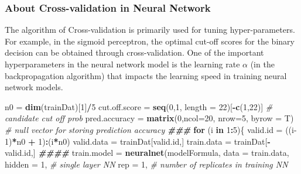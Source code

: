 \documentclass[
]{book}
\newenvironment{Shaded}{\begin{snugshade}}{\end{snugshade}}
\newcommand{\AttributeTok}[1]{\textcolor[rgb]{0.13,0.29,0.53}{#1}}
\newcommand{\CommentTok}[1]{\textcolor[rgb]{0.56,0.35,0.01}{\textit{#1}}}
\newcommand{\ControlFlowTok}[1]{\textcolor[rgb]{0.13,0.29,0.53}{\textbf{#1}}}
\newcommand{\DecValTok}[1]{\textcolor[rgb]{0.00,0.00,0.81}{#1}}
\newcommand{\DocumentationTok}[1]{\textcolor[rgb]{0.56,0.35,0.01}{\textbf{\textit{#1}}}}
\newcommand{\FunctionTok}[1]{\textcolor[rgb]{0.13,0.29,0.53}{\textbf{#1}}}
\newcommand{\NormalTok}[1]{#1}
\newcommand{\OtherTok}[1]{\textcolor[rgb]{0.56,0.35,0.01}{#1}}
\newcommand{\SpecialCharTok}[1]{\textcolor[rgb]{0.81,0.36,0.00}{\textbf{#1}}}
\begin{document}
\hypertarget{about-cross-validation-in-neural-network}{%
\subsubsection{About Cross-validation in Neural Network}\label{about-cross-validation-in-neural-network}}

The algorithm of Cross-validation is primarily used for tuning hyper-parameters. For example, in the sigmoid perceptron, the optimal cut-off scores for the binary decision can be obtained through cross-validation. One of the important hyperparameters in the neural network model is the learning rate \(\alpha\) (in the backpropagation algorithm) that impacts the learning speed in training neural network models.

\begin{Shaded}
\begin{Highlighting}[]
\NormalTok{n0 }\OtherTok{=} \FunctionTok{dim}\NormalTok{(trainDat)[}\DecValTok{1}\NormalTok{]}\SpecialCharTok{/}\DecValTok{5}
\NormalTok{cut.off.score }\OtherTok{=} \FunctionTok{seq}\NormalTok{(}\DecValTok{0}\NormalTok{,}\DecValTok{1}\NormalTok{, }\AttributeTok{length =} \DecValTok{22}\NormalTok{)[}\SpecialCharTok{{-}}\FunctionTok{c}\NormalTok{(}\DecValTok{1}\NormalTok{,}\DecValTok{22}\NormalTok{)]        }\CommentTok{\# candidate cut off prob}
\NormalTok{pred.accuracy }\OtherTok{=} \FunctionTok{matrix}\NormalTok{(}\DecValTok{0}\NormalTok{,}\AttributeTok{ncol=}\DecValTok{20}\NormalTok{, }\AttributeTok{nrow=}\DecValTok{5}\NormalTok{, }\AttributeTok{byrow =}\NormalTok{ T)  }\CommentTok{\# null vector for storing prediction accuracy}
\DocumentationTok{\#\#\#}
\ControlFlowTok{for}\NormalTok{ (i }\ControlFlowTok{in} \DecValTok{1}\SpecialCharTok{:}\DecValTok{5}\NormalTok{)\{}
\NormalTok{  valid.id }\OtherTok{=}\NormalTok{ ((i}\DecValTok{{-}1}\NormalTok{)}\SpecialCharTok{*}\NormalTok{n0 }\SpecialCharTok{+} \DecValTok{1}\NormalTok{)}\SpecialCharTok{:}\NormalTok{(i}\SpecialCharTok{*}\NormalTok{n0)}
\NormalTok{  valid.data }\OtherTok{=}\NormalTok{ trainDat[valid.id,]}
\NormalTok{  train.data }\OtherTok{=}\NormalTok{ trainDat[}\SpecialCharTok{{-}}\NormalTok{valid.id,]}
  \DocumentationTok{\#\#\#\#}
\NormalTok{  train.model }\OtherTok{=} \FunctionTok{neuralnet}\NormalTok{(modelFormula,}
                         \AttributeTok{data =}\NormalTok{ train.data,}
                         \AttributeTok{hidden =} \DecValTok{1}\NormalTok{,               }\CommentTok{\# single layer NN}
                         \AttributeTok{rep =} \DecValTok{1}\NormalTok{,                  }\CommentTok{\# number of replicates in training NN}

\end{Highlighting}
\end{Shaded}
\end{document}
